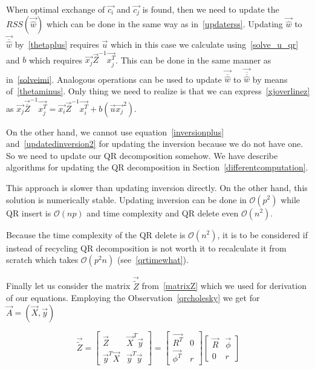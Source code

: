 When optimal exchange of $\vec{c_i}$ and $ \vec{c_j}$ is found, then we need to update the $RSS(\vec{\hat{w}})$ which can be done in the same way as in~\eqref{updaterss}. Updating $\vec{\hat{w}}$ to  $\vec{\overline{\hat{w}}}$ by~\eqref{thetaplus} requires
$\vec{u}$  which in this case we calculate using~\eqref{solve_u_qr} and $b$ which requires  $\vec{x_j}\vec{Z}^{-1}\vec{x_j^T}$. This can be done in the same manner as in~\eqref{solveimi}. Analogous operations can be used to update $\vec{\overline{\hat{w}}}$ to $\vec{\overline{\overline{\hat{w}}}}$  by means of~\eqref{thetaminus}. Only thing we need to realize is that we can express~\eqref{xjoverlinez} as $\vec{x_j}\vec{\overline{{Z}}}^{-1}\vec{x_j^T} = \vec{x_i}\vec{{{Z}}}^{-1}\vec{x_i^T} + b(\vec{u}\vec{x_j}^2)$.

On the other hand, we cannot use equation~\eqref{inversionplus} and~\eqref{updatedinversion2} for updating the inversion because we do not have one. So we need to update our QR decomposition somehow. We have describe algorithms for updating the QR decomposition in Section~\ref{differentcomputation}. 

This approach is slower than updating inversion directly. On the other hand, this solution is numerically stable. Updating inversion can be done in $\mathcal{O}(p^2)$  while QR insert is $\mathcal{O}(np)$ and time complexity and QR delete even $\mathcal{O}(n^2)$.


\begin{note}
Because the time complexity of the QR delete is $\mathcal{O}(n^2)$, it is to be considered if instead of recycling QR decomposition is not worth it to recalculate it from scratch which takes $\mathcal{O}(p^2n)$ (see~\eqref{qrtimewhat}).
\end{note}


Finally let us consider the matrix $\vec{\tilde{Z}}$ from~\eqref{matrixZ} which we used for derivation of our equations. Employing the Observation~\ref{qrcholesky}  we get for $\vec{A} = (\vec{X}, \vec{y})$ 

\begin{equation}
    \vec{\tilde{Z}} = 
    \begin{bmatrix}
        \vec{Z} & \vec{X}^T\vec{y} \\
    \vec{y}^T\vec{X} & \vec{y}^T\vec{y}
    \end{bmatrix} 
    = 
    \begin{bmatrix}
        \vec{R^T} & 0 \\
    \vec{\phi^T} & r
    \end{bmatrix} 
    \begin{bmatrix} 
        \vec{R} & \vec{\phi} \\
     0 & r
    \end{bmatrix} 
\end{equation}


